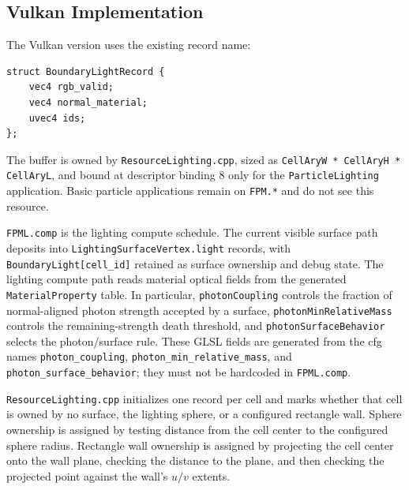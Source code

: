 \subsection{Vulkan Implementation}

The Vulkan version uses the existing record name:
\begin{verbatim}
struct BoundaryLightRecord {
    vec4 rgb_valid;
    vec4 normal_material;
    uvec4 ids;
};
\end{verbatim}

The buffer is owned by \texttt{ResourceLighting.cpp}, sized as
\texttt{CellAryW * CellAryH * CellAryL}, and bound at descriptor binding 8
only for the \texttt{ParticleLighting} application.  Basic particle
applications remain on \texttt{FPM.*} and do not see this resource.

\texttt{FPML.comp} is the lighting compute schedule.  The current visible
surface path deposits into \texttt{LightingSurfaceVertex.light} records, with
\texttt{BoundaryLight[cell\_id]} retained as surface ownership and debug
state.  The lighting compute path reads material optical fields from the
generated \texttt{MaterialProperty} table.  In particular,
\texttt{photonCoupling} controls the fraction of normal-aligned photon
strength accepted by a surface, \texttt{photonMinRelativeMass} controls the
remaining-strength death threshold, and \texttt{photonSurfaceBehavior}
selects the photon/surface rule.  These GLSL fields are generated from the
cfg names \texttt{photon\_coupling},
\texttt{photon\_min\_relative\_mass}, and
\texttt{photon\_surface\_behavior}; they must not be hardcoded in
\texttt{FPML.comp}.

\texttt{ResourceLighting.cpp} initializes one record per cell and marks
whether that cell is owned by no surface, the lighting sphere, or a
configured rectangle wall.  Sphere ownership is assigned by testing distance
from the cell center to the configured sphere radius.  Rectangle wall
ownership is assigned by projecting the cell center onto the wall plane,
checking the distance to the plane, and then checking the projected point
against the wall's \(u/v\) extents.

